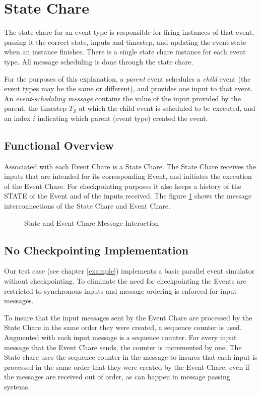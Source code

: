 \section{State Chare}

The state chare for an event type is responsible for firing instances of
that event, passing it the correct state, inputs and timestep, and
updating the event state when an instance finishes.  There is a single
state chare instance for each event type.  All message scheduling is
done through the state chare.

For the purposes of this explanation, a {\em parent} event schedules a
{\em child} event (the event types may be the same or different), and
provides one input to that event.  An {\em event-scheduling message}
contains the value of the input provided by the parent, the timestep
$T_S$ at which the child event is scheduled to be executed, and an index
$i$ indicating which parent (event type) created the event.

\subsection{Functional Overview}

Associated with each Event Chare is a State Chare.  The State Chare
receives the inputs that are intended for its corresponding Event, and
initiates the execution of the Event Chare.  For checkpointing purposes
it also keeps a history of the STATE of the Event and of the inputs
received.  The figure \ref{figStateEvent}  shows the message
interconnections of the State Chare and Event Chare.

\begin{figure}
\label{figStateEvent}
\centerline{}
\caption{State and Event Chare Message Interaction}
\end{figure}

\subsection{No Checkpointing Implementation}

Our test case (see chapter \ref{example}) implements a basic parallel
event simulator without checkpointing.  To eliminate the need for
checkpointing the Events are restricted to synchronous inputs and
message ordering is enforced for input messages.

To insure that the input messages sent by the Event Chare are processed
by the State Chare in the same order they were created, a sequence
counter is used.  Augmented with each input message is a sequence
counter.  For every input message that the Event Chare sends,
the counter is incremented by one.  The State chare uses the sequence
counter in the message to insures that each input is processed in the same
order that they were created by the Event Chare, even if the messages are
received out of order, as can happen in message passing systems.

